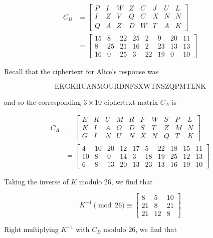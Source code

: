 \documentclass{paper}
\begin{document}
\begin{equation*}
    \begin{split}
        C_B & = \begin{bmatrix}P & I & W & Z & C & J & U & L \\ I & Z & V & Q & C & X & N & N \\ Q & A & Z & D & W & T & A & K \end{bmatrix} \\
        & = \begin{bmatrix}15 & 8 & 22 & 25 & 2 & 9 & 20 & 11 \\ 8 & 25 & 21 & 16 & 2 & 23 & 13 & 13 \\ 16 & 0 & 25 & 3 & 22 & 19 & 0 & 10\end{bmatrix}
    \end{split}
\end{equation*}

Recall that the ciphertext for Alice's response was 

\[ \mathrm{EKGKIIUANMOURDNFSXWTNSZQPMTLNK} \]

and so the corresponding $3 \times 10$ ciphertext matrix $C_A$  is

\begin{equation*}
    \begin{split}
        C_A & = \begin{bmatrix}E & K & U & M & R & F & W &S & P & L \\ K & I & A & O & D & S & T & Z & M & N \\ G & I & N & U & N & X & N & Q & T & K\end{bmatrix} \\
        & = \begin{bmatrix}4 & 10 & 20 & 12 & 17 & 5 & 22 & 18 & 15 & 11 \\ 10 & 8 & 0 & 14 & 3 & 18 & 19 & 25 & 12 & 13 \\ 6 & 8 & 13 & 20 & 13 & 23 & 13 & 16 & 19 & 10\end{bmatrix}
    \end{split}
\end{equation*}

Taking the inverse of $K$ modulo 26, we find that 

\[ K^{-1} \pmod{26} \equiv \begin{bmatrix}8 & 5 & 10 \\ 21 & 8 & 21 \\ 21 & 12 & 8\end{bmatrix} \]

Right multiplying $K^{-1}$ with $C_B$ modulo 26, we find that
\end{document}
